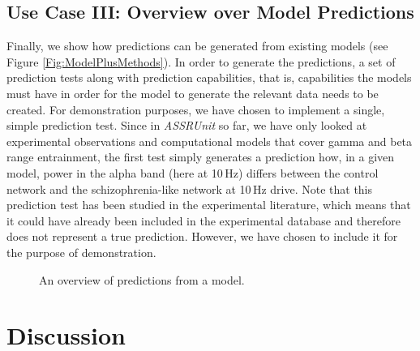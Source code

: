 \documentclass[a4paper,10pt]{article}
\begin{document}
\subsection{Use Case III: Overview over Model Predictions}
Finally, we show how predictions can be generated from existing models (see Figure \ref{Fig:ModelPlusMethods}). In order to generate the predictions, a set of prediction tests along with prediction capabilities, that is, capabilities the models must have 
in order for the model to generate the relevant data needs to be created. For demonstration purposes, we have chosen to implement a single, simple prediction test. Since in \textit{ASSRUnit} so far, we have only looked 
at experimental observations and computational models that cover gamma and beta range entrainment, the first test simply generates a prediction how, in a given model, power in the alpha band (here at 10\,Hz)
differs between the control network and the schizophrenia-like network at 10\,Hz drive.
Note that this prediction 
test has been studied in the experimental literature, which means that it could have already been included in the experimental database and therefore does not represent a true prediction.
However, we have chosen to include it for the purpose of demonstration. 
\begin{figure}
\label{Fig:Tests4040}
\caption{An overview of predictions from a model.}
\end{figure}

\FloatBarrier
\section{Discussion}
\end{document}
